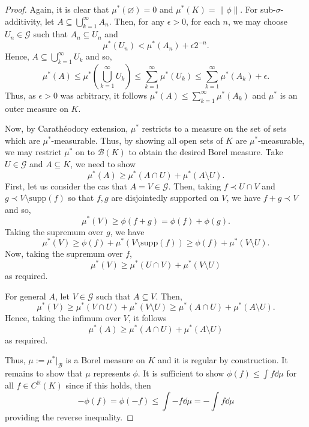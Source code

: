 \documentclass[]{article}
\theoremstyle{definition}
\begin{document}
\begin{proof}
  Again, it is clear that \(\mu^*(\varnothing) = 0\) and \(\mu^*(K) = \|\phi\|\). For sub-\(\sigma\)-additivity,
  let \(A \subseteq \bigcup_{k = 1}^\infty A_n\). Then, for any \(\epsilon > 0\), for each \(n\), we may choose 
  \(U_n \in \mathcal{G}\) such that \(A_n \subseteq U_n\) and 
  \[\mu^*(U_n) < \mu^*(A_n) + \epsilon 2^{-n}.\]
  Hence, \(A \subseteq \bigcup_{k = 1}^\infty U_k\) and so,
  \[\mu^*(A) \le \mu^*\left(\bigcup_{k = 1}^\infty U_k\right) \le \sum_{k = 1}^\infty \mu^*(U_k) 
    \le \sum_{k = 1}^\infty \mu^*(A_k) + \epsilon.\]
  Thus, as \(\epsilon > 0\) was arbitrary, it follows \(\mu^*(A) \le \sum_{k = 1}^\infty \mu^*(A_k)\) 
  and \(\mu^*\) is an outer measure on \(K\). 
  
  Now, by Carathéodory extension, \(\mu^*\) restricts to a 
  measure on the set of sets which are \(\mu^*\)-measurable. Thus, by showing all open sets of \(K\) 
  are \(\mu^*\)-measurable, we may restrict \(\mu^*\) on to \(\mathcal{B}(K)\) to obtain the desired 
  Borel measure. Take \(U \in \mathcal{G}\) and \(A \subseteq K\), we need to show 
  \[\mu^*(A) \ge \mu^*(A \cap U) + \mu^*(A \setminus U).\]
  First, let us consider the cas that \(A = V \in \mathcal{G}\). Then, taking \(f \prec U \cap V\) 
  and \(g \prec V \setminus \text{supp}(f)\) so that \(f, g\) are disjointedly supported on \(V\), 
  we have \(f + g \prec V\) and so, 
  \[\mu^*(V) \ge \phi(f + g) = \phi(f) + \phi(g).\]
  Taking the supremum over \(g\), we have 
  \[\mu^*(V) \ge \phi(f) + \mu^*(V \setminus \text{supp}(f)) \ge \phi(f) + \mu^*(V \setminus U).\]
  Now, taking the supremum over \(f\), 
  \[\mu^*(V) \ge \mu^*(U \cap V) + \mu^*(V \setminus U)\]
  as required. 

  For general \(A\), let \(V \in \mathcal{G}\) such that \(A \subseteq V\). Then, 
  \[\mu^*(V) \ge \mu^*(V \cap U) + \mu^*(V \setminus U) \ge \mu^*(A \cap U) + \mu^*(A \setminus U).\]
  Hence, taking the infimum over \(V\), it follows 
  \[\mu^*(A) \ge \mu^*(A \cap U) + \mu^*(A \setminus U)\]
  as required.

  Thus, \(\mu := \mu^*|_{\mathcal{B}}\) is a Borel measure on \(K\) and it is regular by construction. 
  It remains to show that \(\mu\) represents \(\phi\). It is sufficient to show \(\phi(f) \le \int f \dd \mu\) 
  for all \(f \in C^\mathbb{R}(K)\) since if this holds, then 
  \[- \phi(f) = \phi(-f) \le \int -f \dd \mu = - \int f \dd \mu\]
  providing the reverse inequality. 


\end{proof}
\end{document}
